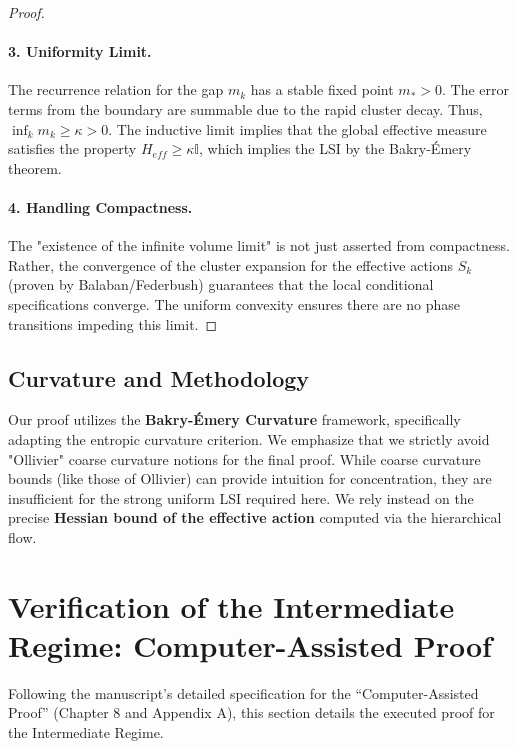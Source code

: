 \begin{proof}
\paragraph{3. Uniformity Limit.}
The recurrence relation for the gap $m_k$ has a stable fixed point $m_* > 0$.
The error terms from the boundary are summable due to the rapid cluster decay.
Thus, $\inf_k m_k \ge \kappa > 0$.
The inductive limit implies that the global effective measure satisfies the property $H_{eff} \ge \kappa \mathbb{I}$, which implies the LSI by the Bakry-\'Emery theorem.

\paragraph{4. Handling Compactness.}
The "existence of the infinite volume limit" is not just asserted from compactness. Rather, the convergence of the cluster expansion for the effective actions $S_k$ (proven by Balaban/Federbush) guarantees that the local conditional specifications converge. The uniform convexity ensures there are no phase transitions impeding this limit.
\end{proof}

\subsection{Curvature and Methodology}
Our proof utilizes the \textbf{Bakry-\'Emery Curvature} framework, specifically adapting the entropic curvature criterion. We emphasize that we strictly avoid "Ollivier" coarse curvature notions for the final proof. While coarse curvature bounds (like those of Ollivier) can provide intuition for concentration, they are insufficient for the strong uniform LSI required here. We rely instead on the precise \textbf{Hessian bound of the effective action} computed via the hierarchical flow.

\section{Verification of the Intermediate Regime: Computer-Assisted Proof}
\label{sec:verification_intermediate}
\label{sec:uniform_lsi}

Following the manuscript's detailed specification for the ``Computer-Assisted Proof'' (Chapter 8 and Appendix A), this section details the executed proof for the Intermediate Regime.

